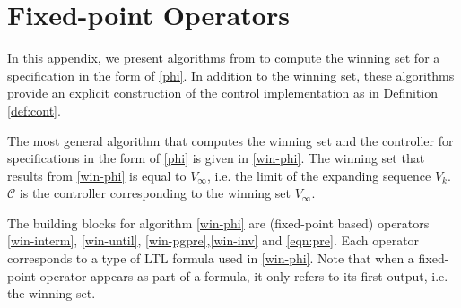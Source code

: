 \section{Fixed-point Operators}\label{app:basic-alg}

In this appendix, we present algorithms from \cite{Nilsson2017} to compute the winning set for a specification in the form of \eqref{phi}. In addition to the winning set, these algorithms provide an explicit construction of the control implementation as in Definition \ref{def:cont}. 

The most general algorithm that computes the winning set and the controller for specifications in the form of \eqref{phi} is given in \eqref{win-phi}. The winning set that results from \eqref{win-phi} is equal to $ V_{\infty} $, i.e. the limit of the expanding sequence $V_k$. $ \mathcal{C} $ is the controller corresponding to the winning set $ V_{\infty} $. 

The building blocks for algorithm \eqref{win-phi} are (fixed-point based) operators \eqref{win-interm}, \eqref{win-until}, \eqref{win-pgpre},\eqref{win-inv} and \eqref{eqn:pre}. Each operator corresponds to a type of LTL formula used in \eqref{win-phi}. Note that when a fixed-point operator appears as part of a formula, it only refers to its first output, i.e. the winning set.




